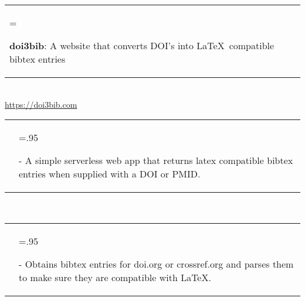 \documentclass[letterpaper,11pt]{article}
\newcommand{\itemHeadings}[4]{
    \begin{tabularx}{\textwidth} {>{\hsize=.65\textwidth\raggedright\arraybackslash}X 
   >{\raggedleft\arraybackslash}X}
      #1 & \small#2 \\
      #3 & \small#4
    \end{tabularx}
    \\
}
\newcommand{\itemitems}[1]{
    \begin{tabularx}{\textwidth} {>{\raggedleft\arraybackslash}X >{\hsize=.95\textwidth\raggedright\arraybackslash}X}
      &- \small#1 \\
    \end{tabularx}
    \\
}
\newcommand{\projH}[1]{
    \begin{tabularx}{\textwidth} {>{\hsize=\textwidth\raggedright\arraybackslash}X}
      #1 \\
    \end{tabularx}
    \\
}
\begin{document}
    \projH{\textbf{doi3bib}: A website that converts DOI's into \LaTeX~compatible bibtex entries}{\hspace*{.5cm}\url{https://doi3bib.com}}\\
        \itemitems
            {A simple serverless web app that returns latex compatible bibtex entries when supplied with a DOI or PMID.}
        \itemitems
            {Obtains bibtex entries for doi.org or crossref.org and parses them to make sure they are compatible with \LaTeX.}


\end{document}
